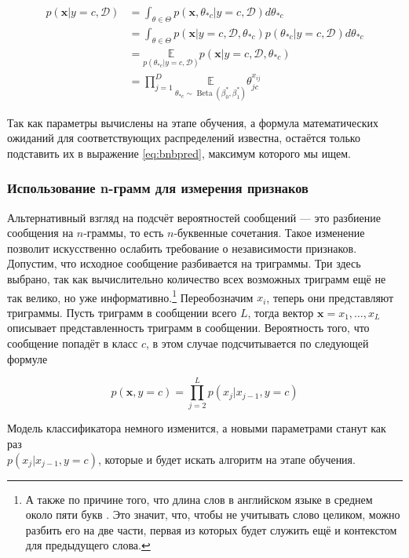 \begin{align}
  p(\mathbf{x}|y=c,\mathcal{D}) &=\int_{\theta\in\Theta}p(\mathbf{x},\theta_{*c}|y=c,\mathcal{D})d\theta_{*c}\label{eq:maththeta1}\\
  &=\int_{\theta\in\Theta}p(\mathbf{x}|y=c,\mathcal{D},\theta_{*c})p(\theta_{*c}|y=c,\mathcal{D})d\theta_{*c}\label{eq:maththeta2}\\
  &=\underset{p(\theta_{*c}|y=c,\mathcal{D})} {\mathbb{E}}p(\mathbf{x}|y=c,\mathcal{D},\theta_{*c})\label{eq:maththeta2}\\
  &=\prod_{j=1}^D\underset{\theta_{*c}\sim\operatorname{Beta}(\beta_0^*,\beta_1^*)}{\mathbb{E}}\theta_{jc}^{x_{ij}}
\end{align}

Так как параметры вычислены на этапе обучения, а формула математических ожиданий для
соответствующих распределений известна, остаётся только подставить их в выражение \ref{eq:bnbpred},
максимум которого мы ищем.

\subsubsection{Использование n-грамм для измерения признаков}\label{ngram}
Альтернативный взгляд на подсчёт вероятностей сообщений --- это разбиение сообщения на $n$-граммы, то
есть $n$-буквенные сочетания. Такое изменение позволит искусственно ослабить требование о
независимости признаков. Допустим, что исходное сообщение разбивается на триграммы. Три здесь выбрано,
так как вычислительно количество всех возможных триграмм ещё не так велико, но уже информативно.\footnote{
А также по причине того, что длина слов в английском языке  в
среднем около пяти букв \cite{balota2007english}. Это значит, что, чтобы не учитывать
слово целиком, можно разбить его на две части, первая из которых
будет служить ещё и контекстом для предыдущего слова.
}
Переобозначим $x_i$, теперь они представляют триграммы. Пусть триграмм в сообщении всего $L$, тогда
вектор $\mathbf{x} = {x_1, \ldots, x_L}$ описывает представленность триграмм в сообщении.
Вероятность того, что сообщение попадёт в класс $c$, в этом случае подсчитывается по следующей формуле

\begin{equation}
  p(\mathbf{x}, y=c) = \prod_{j=2}^Lp(x_j|x_{j-1},y=c)
\end{equation}

Модель классификатора немного изменится, а новыми параметрами станут как раз\\
$p(x_j|x_{j-1},y=c)$, которые и будет искать алгоритм на этапе обучения.

